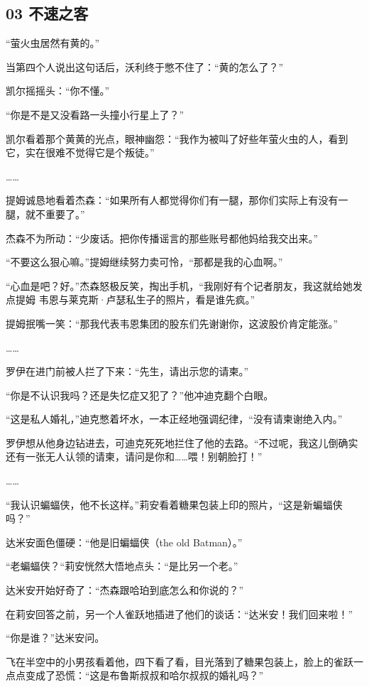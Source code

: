 \documentclass[../main]{subfiles}
\begin{document}
\hypertarget{03-ux4e0dux901fux4e4bux5ba2}{%
    \subsection{03 不速之客}\label{03-ux4e0dux901fux4e4bux5ba2}}

“萤火虫居然有黄的。”

当第四个人说出这句话后，沃利终于憋不住了：“黄的怎么了？”

凯尔摇摇头：“你不懂。”

“你是不是又没看路一头撞小行星上了？”

凯尔看着那个黄黄的光点，眼神幽怨：“我作为被叫了好些年萤火虫的人，看到它，实在很难不觉得它是个叛徒。”

……

提姆诚恳地看着杰森：“如果所有人都觉得你们有一腿，那你们实际上有没有一腿，就不重要了。”

杰森不为所动：“少废话。把你传播谣言的那些账号都他妈给我交出来。”

“不要这么狠心嘛。”提姆继续努力卖可怜，“那都是我的心血啊。”

“心血是吧？好。”杰森怒极反笑，掏出手机，“我刚好有个记者朋友，我这就给她发点提姆
韦恩与莱克斯·卢瑟私生子的照片，看是谁先疯。”

提姆抿嘴一笑：“那我代表韦恩集团的股东们先谢谢你，这波股价肯定能涨。”

……

罗伊在进门前被人拦了下来：“先生，请出示您的请柬。”

“你是不认识我吗？还是失忆症又犯了？”他冲迪克翻个白眼。

“这是私人婚礼，”迪克憋着坏水，一本正经地强调纪律，“没有请柬谢绝入内。”

罗伊想从他身边钻进去，可迪克死死地拦住了他的去路。“不过呢，我这儿倒确实还有一张无人认领的请柬，请问是你和……喂！别朝脸打！”

……

“我认识蝙蝠侠，他不长这样。”莉安看着糖果包装上印的照片，“这是新蝙蝠侠吗？”

达米安面色僵硬：“他是旧蝙蝠侠（the old Batman）。”

“老蝙蝠侠？“莉安恍然大悟地点头：“是比另一个老。”

达米安开始好奇了：“杰森跟哈珀到底怎么和你说的？”

在莉安回答之前，另一个人雀跃地插进了他们的谈话：“达米安！我们回来啦！”

“你是谁？”达米安问。

飞在半空中的小男孩看着他，四下看了看，目光落到了糖果包装上，脸上的雀跃一点点变成了恐慌：“这是布鲁斯叔叔和哈尔叔叔的婚礼吗？”
\end{document}
